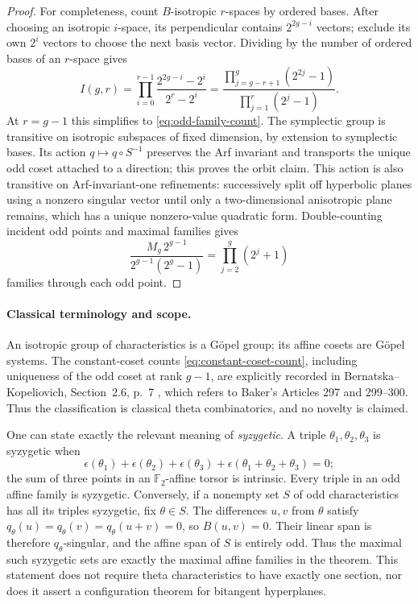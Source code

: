 \begin{proof}
For completeness, count \(B\)-isotropic \(r\)-spaces by ordered bases.
After choosing an isotropic \(i\)-space, its perpendicular contains
\(2^{2g-i}\) vectors; exclude its own \(2^i\) vectors to choose the next
basis vector. Dividing by the number of ordered bases of an \(r\)-space
gives
\begin{equation}
 I(g,r)=
 \prod_{i=0}^{r-1}
 \frac{2^{2g-i}-2^i}{2^r-2^i}
 =
 \frac{\prod_{j=g-r+1}^g(2^{2j}-1)}
      {\prod_{j=1}^r(2^j-1)}.
 \label{eq:isotropic-space-count}
\end{equation}
At \(r=g-1\) this simplifies to \eqref{eq:odd-family-count}.
The symplectic group is transitive on isotropic subspaces of fixed
dimension, by extension to symplectic bases. Its action
\(q\mapsto q\circ S^{-1}\) preserves the Arf invariant and transports
the unique odd coset attached to a direction; this proves the orbit
claim. This action is also transitive on Arf-invariant-one refinements:
successively split off hyperbolic planes using a nonzero singular vector
until only a two-dimensional anisotropic plane remains, which has a
unique nonzero-value quadratic form. Double-counting incident odd
points and maximal families gives
\[
 \frac{M_g\,2^{g-1}}{2^{g-1}(2^g-1)}
 =\prod_{j=2}^g(2^j+1)
\]
families through each odd point.
\end{proof}

\paragraph{Classical terminology and scope.}
An isotropic group of characteristics is a G\"opel group; its affine
cosets are G\"opel systems. The constant-coset counts
\eqref{eq:constant-coset-count}, including uniqueness of the odd coset
at rank \(g-1\), are explicitly recorded in
Bernatska--Kopeliovich, Section~2.6, p.~7
\citep{BernatskaKopeliovich2023}, which refers to Baker's Articles
297 and 299--300. Thus the classification is classical theta
combinatorics, and no novelty is claimed.

One can state exactly the relevant meaning of \emph{syzygetic}.
A triple \(\theta_1,\theta_2,\theta_3\) is syzygetic when
\[
 \epsilon(\theta_1)+\epsilon(\theta_2)+\epsilon(\theta_3)
 +\epsilon(\theta_1+\theta_2+\theta_3)=0;
\]
the sum of three points in an \(\mathbb F_2\)-affine torsor is intrinsic.
Every triple in an odd affine family is syzygetic. Conversely, if a
nonempty set \(S\) of odd characteristics has all its triples
syzygetic, fix \(\theta\in S\). The differences \(u,v\) from \(\theta\)
satisfy \(q_\theta(u)=q_\theta(v)=q_\theta(u+v)=0\), so \(B(u,v)=0\).
Their linear span is therefore \(q_\theta\)-singular, and the affine
span of \(S\) is entirely odd. Thus the maximal such syzygetic sets are
exactly the maximal affine families in the theorem. This statement
does not require theta characteristics to have exactly one section,
nor does it assert a configuration theorem for bitangent hyperplanes.

